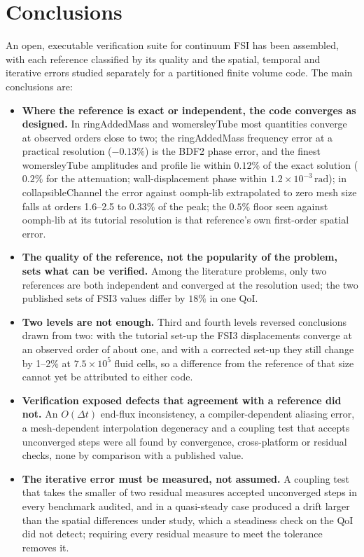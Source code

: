 \documentclass[sn-mathphys,Numbered]{sn-jnl}%
\begin{document}
\section{Conclusions} \label{sec:conclusion}
An open, executable verification suite for continuum FSI has been assembled, with each reference classified by its quality and the spatial, temporal and iterative errors studied separately for a partitioned finite volume code.
The main conclusions are:
\begin{itemize}
	\item \textbf{Where the reference is exact or independent, the code converges as designed.} In ringAddedMass and womersleyTube most quantities converge at observed orders close to two; the ringAddedMass frequency error at a practical resolution ($-0.13\%$) is the BDF2 phase error, and the finest womersleyTube amplitudes and profile lie within $0.12\%$ of the exact solution ($0.2\%$ for the attenuation; wall-displacement phase within $1.2\times10^{-3}\,\mathrm{rad}$); in collapsibleChannel the error against oomph-lib extrapolated to zero mesh size falls at orders 1.6--2.5 to $0.33\%$ of the peak; the $0.5\%$ floor seen against oomph-lib at its tutorial resolution is that reference's own first-order spatial error.
	\item \textbf{The quality of the reference, not the popularity of the problem, sets what can be verified.} Among the literature problems, only two references are both independent and converged at the resolution used; the two published sets of FSI3 values differ by $18\%$ in one QoI.
	\item \textbf{Two levels are not enough.} Third and fourth levels reversed conclusions drawn from two: with the tutorial set-up the FSI3 displacements converge at an observed order of about one, and with a corrected set-up they still change by 1--2\% at $7.5\times10^5$ fluid cells, so a difference from the reference of that size cannot yet be attributed to either code.
	\item \textbf{Verification exposed defects that agreement with a reference did not.} An $O(\Delta t)$ end-flux inconsistency, a compiler-dependent aliasing error, a mesh-dependent interpolation degeneracy and a coupling test that accepts unconverged steps were all found by convergence, cross-platform or residual checks, none by comparison with a published value.
	\item \textbf{The iterative error must be measured, not assumed.} A coupling test that takes the smaller of two residual measures accepted unconverged steps in every benchmark audited, and in a quasi-steady case produced a drift larger than the spatial differences under study, which a steadiness check on the QoI did not detect; requiring every residual measure to meet the tolerance removes it.
\end{itemize}
\end{document}
